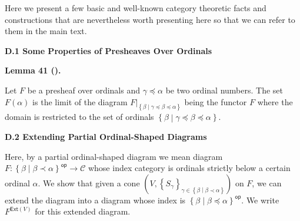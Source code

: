  
Here we present a few basic and well-known category theoretic facts and constructions that are nevertheless worth presenting here so that we can refer to them in the main text.\par
 
 
 
\par\medskip\noindent\textbf{D.1 Some Properties of Presheaves Over Ordinals}\par
 
 
\par\medskip\noindent\textbf{Lemma 41 ().}\par
 
 
Let $F$ be a presheaf over ordinals and $\gamma\preceq\alpha$ be two ordinal numbers. The set $F(\alpha)$ is the limit of the diagram ${\left.F\right|}_{\left\{\beta\middle|\gamma\preceq\beta\preceq\alpha\right\}}$ being the functor $F$ where the domain is restricted to the set of ordinals $\left\{\beta\middle|\gamma\preceq\beta\preceq\alpha\right\}$.\par
 
 
 
 
 
\par\medskip\noindent\textbf{D.2 Extending Partial Ordinal-Shaped Diagrams}\par
 
 
Here, by a partial ordinal-shaped diagram we mean diagram $F:{\left\{\beta\middle|\beta\prec\alpha\right\}}^{\mathsf{op}}\to\mathcal{C}$ whose index category is ordinals strictly below a certain ordinal $\alpha$. We show that given a cone $(V,\left\{S_{\gamma}\right\}_{\gamma\in\left\{\beta\middle|\beta\prec\alpha\right\}})$ on $F$, we can extend the diagram into a diagram whose index is ${\left\{\beta\middle|\beta\preceq\alpha\right\}}^{\mathsf{op}}$. We write $F^{\mathsf{Ext}(V)}$ for this extended diagram.\par
 
